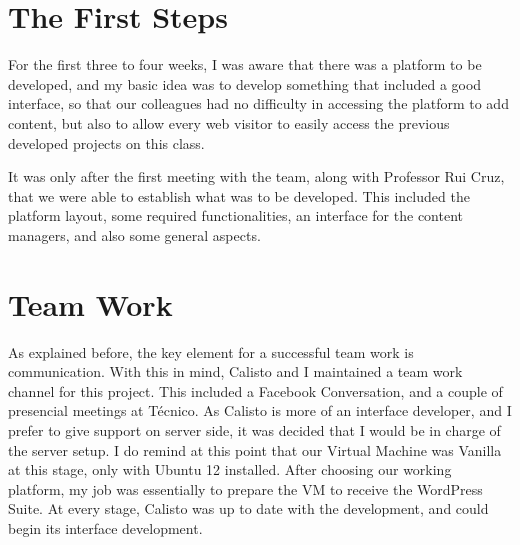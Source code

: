 \documentclass[a4paper,12pt,journal,twoside,compsoc]{PPIEEEtran}
\begin{document}
\section{The First Steps}
For the first three to four weeks, I was aware that there was a platform to be developed, and my basic idea was to develop something that included a good interface, so that our colleagues had no difficulty in accessing the platform to add content, but also to allow every web visitor to easily access the previous developed projects on this class.

It was only after the first meeting with the team, along with Professor Rui Cruz, that we were able to establish what was to be developed. This included the platform layout, some required functionalities, an interface for the content managers, and also some general aspects.

\newpage

\section{Team Work}
As explained before, the key element for a successful team work is communication. With this in mind, Calisto and I maintained a team work channel for this project. This included a Facebook Conversation, and a couple of presencial meetings at Técnico. 
As Calisto is more of an interface developer, and I prefer to give support on server side, it was decided that I would be in charge of the server setup. I do remind at this point that our Virtual Machine was Vanilla at this stage, only with Ubuntu 12 installed.
After choosing our working platform, my job was essentially to prepare the VM to receive the WordPress Suite. At every stage, Calisto was up to date with the development, and could begin its interface development.
\end{document}
